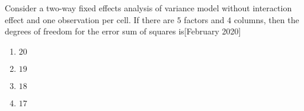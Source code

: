 \iffalse
\chapter{2020}
\author{EE24BTECH11013}
\section{st}
\fi
    \item Consider a two-way fixed effects analysis of variance model without interaction effect and one observation per cell. If there are $5$ factors and $4$ columns, then the degrees of freedom for the error sum of squares is\hfill[February 2020]
    \begin{enumerate}
        \item $20$
        \item $19$
        \item $18$
        \item $17$
    \end{enumerate}
    
